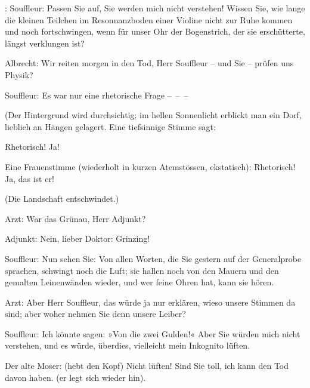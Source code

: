 \pstart
           \introOben{}: \introOben{}Souffleur: Passen Sie auf, Sie
               werden mich nicht verstehen! Wissen Sie, wie lange die kleinen Teilchen im
               Resonnanzboden einer Violine nicht zur Ruhe kommen und noch
               fortschwingen, wenn für unser Ohr der Bogenstrich, der sie erschütterte, längst
               verklungen ist?\pend
           
\pstart
           Albrecht: Wir reiten morgen in den Tod, Herr Souffleur – und Sie – prüfen uns
               Physik?\pend
           
\pstart
           {\pb}Souffleur: Es war nur eine
               rhetorische Frage – – –\pend
           
\pstart
           (Der Hintergrund wird durchsichtig; im hellen Sonnenlicht erblickt man ein Dorf,
               lieblich an Hängen gelagert. Eine tiefsinnige Stimme sagt:\pend
           
\pstart
           Rhetorisch! Ja!\pend
           
\pstart
           Eine Frauenstimme (wiederholt in kurzen Atemstössen, ekstatisch): Rhetorisch! Ja, das
               ist er!\pend
           
\pstart
           (Die Landschaft entschwindet.)\pend
           
\pstart
           Arzt: War das Grünau, Herr Adjunkt?\pend
           
\pstart
           Adjunkt: Nein, lieber Doktor: Grinzing!\pend
           
\pstart
           Souffleur: Nun sehen Sie: Von allen Worten, die Sie gestern auf der Generalprobe
               sprachen, schwingt noch die Luft; sie hallen noch von den Mauern und den gemalten
               Leinenwänden wieder, und wer feine Ohren hat, kann sie hören.\pend
           
\pstart
           Arzt: Aber Herr Souffleur, das würde ja nur erklären, wieso unsere Stimmen da sind;
               aber woher nehmen Sie denn unsere Leiber?\pend
           
\pstart
           Souffleur: Ich könnte sagen: »Von die zwei Gulden!« Aber Sie würden mich nicht
               verstehen, und es würde, überdies, vielleicht mein Inkognito lüften.\pend
           
\pstart
           Der alte Moser: (hebt den Kopf) Nicht lüften! Sind Sie toll, ich kann den Tod davon
               haben. (er legt sich wieder hin).\pend
           
